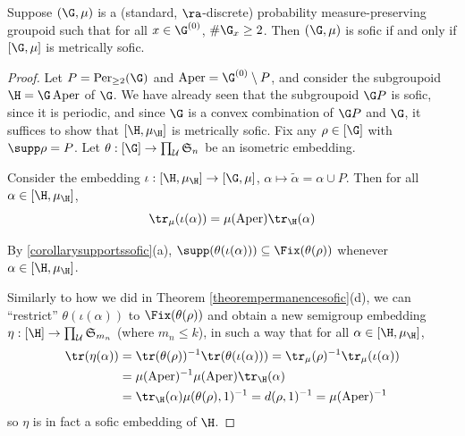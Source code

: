 \begin{theorem}
Suppose $(\G,\mu)$ is a (standard, $\ra$-discrete) probability measure-preserving groupoid such that for all $x\in\G^{(0)}$, $\#\G_x\geq 2$. Then $(\G,\mu)$ is sofic if and only if $[\G,\mu]$ is metrically sofic.
\end{theorem}
\begin{proof}
Let $P=\operatorname{Per}_{\geq 2}(\G)$ and $\operatorname{Aper}=\G^{(0)}\setminus P$, and consider the subgroupoid $\H=\G\operatorname{Aper}$ of $\G$. We have already seen that the subgroupoid $\G P$ is sofic, since it is periodic, and since $\G$ is a convex combination of $\G P$ and $\G$, it suffices to show that $[\H,\mu_{\H}]$ is metrically sofic. Fix any $\rho\in[\G]$ with $\supp\rho=P$. Let $\theta:[\G]\to\prod_{\mathcal{U}}\mathfrak{S}_n$ be an isometric embedding.

Consider the embedding $\iota:[\H,\mu_{\H}]\to[\G,\mu]$, $\alpha\mapsto \widetilde{\alpha}=\alpha\cup P$. Then for all $\alpha\in[\H,\mu_{\H}]$,
\[\tr_\mu(\iota(\alpha))=\mu(\operatorname{Aper})\tr_{\H}(\alpha)\]

By \ref{corollarysupportssofic}(a), $\supp(\theta(\iota(\alpha)))\subseteq\Fix(\theta(\rho))$ whenever $\alpha\in[\H,\mu_{\H}]$.

Similarly to how we did in Theorem \ref{theorempermanencesofic}(d), we can ``restrict'' $\theta(\iota(\alpha))$ to $\Fix(\theta(\rho))$ and obtain a new semigroup embedding $\eta:[\H]\to\prod_{\mathcal{U}}\mathfrak{S}_{m_n}$ (where $m_n\leq k$), in such a way that for all $\alpha\in[\H,\mu_{\H}]$,
\begin{align*}
\tr(\eta(\alpha))&=\tr(\theta(\rho))^{-1}\tr(\theta(\iota(\alpha)))=\tr_\mu(\rho)^{-1}\tr_\mu(\iota(\alpha))\\
&=\mu(\operatorname{Aper})^{-1}\mu(\operatorname{Aper})\tr_{\H}(\alpha)\\
&=\tr_{\H}(\alpha)\mu(\theta(\rho),1)^{-1}=d(\rho,1)^{-1}=\mu(\operatorname{Aper})^{-1}
\end{align*}
so $\eta$ is in fact a sofic embedding of $\H$.\qedhere
\end{proof}